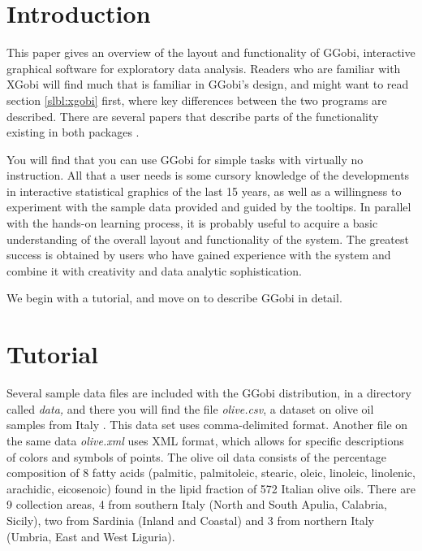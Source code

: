 \documentclass[11pt]{article}
\def\File#1{\textsl{#1}}
\begin{document}
\newpage

\tableofcontents
\newpage

\section{Introduction}

This paper gives an overview of the layout and functionality of GGobi,
interactive graphical software for exploratory data analysis.  Readers
who are familiar with XGobi will find much that is familiar in GGobi's
design, and might want to read section \ref{slbl:xgobi} first, where
key differences between the two programs are described. There are
several papers that describe parts of the functionality existing in
both packages
\cite{BCS95,SCB97,SB98,BAHM88,CBC93,CBCH95,CB95,BCAH95c}.

You will find that you can use GGobi for simple tasks with virtually
no instruction.  All that a user needs is some cursory knowledge of
the developments in interactive statistical graphics of the last 15
years, as well as a willingness to experiment with the sample data
provided and guided by the tooltips.  In parallel with the hands-on
learning process, it is probably useful to acquire a basic
understanding of the overall layout and functionality of the system.
The greatest success is obtained by users who have gained experience
with the system and combine it with creativity and data analytic
sophistication.

We begin with a tutorial, and move on to describe GGobi in detail.

\section{Tutorial}

Several sample data files are included with the GGobi distribution, in
a directory called \File{data,} and there you will find the file
\File{olive.csv}, a dataset on olive oil samples from Italy
\cite{FALT83}.  This data set uses comma-delimited format. Another
file on the same data \File{olive.xml} uses XML format, which allows
for specific descriptions of colors and symbols of points.  The olive
oil data consists of the percentage composition of 8 fatty acids
(palmitic, palmitoleic, stearic, oleic, linoleic, linolenic,
arachidic, eicosenoic) found in the lipid fraction of 572 Italian
olive oils. There are 9 collection areas, 4 from southern Italy (North
and South Apulia, Calabria, Sicily), two from Sardinia (Inland and
Coastal) and 3 from northern Italy (Umbria, East and West Liguria).
\end{document}
